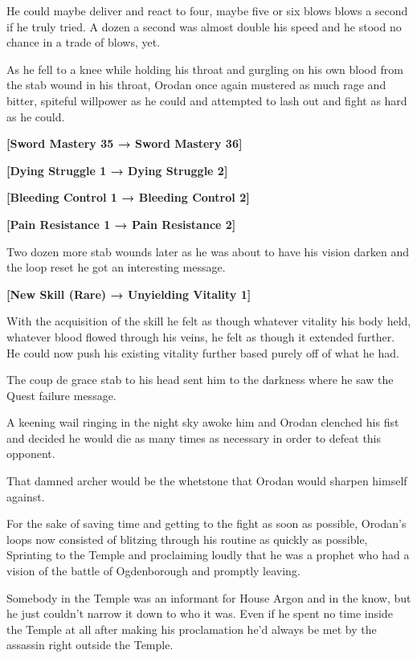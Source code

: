 \documentclass[a4paper,10pt]{book}
\begin{document}
He could maybe deliver and react to four, maybe five or six blows blows a second if he truly tried. A dozen a second was almost double his speed and he stood no chance in a trade of blows, yet.\par
As he fell to a knee while holding his throat and gurgling on his own blood from the stab wound in his throat, Orodan once again mustered as much rage and bitter, spiteful willpower as he could and attempted to lash out and fight as hard as he could.\par
\textbf{[Sword Mastery 35 → Sword Mastery 36]}\par
\textbf{[Dying Struggle 1 → Dying Struggle 2]}\par
\textbf{[Bleeding Control 1 → Bleeding Control 2]}\par
\textbf{[Pain Resistance 1 → Pain Resistance 2]}\par
Two dozen more stab wounds later as he was about to have his vision darken and the loop reset he got an interesting message.\par
\textbf{[New Skill (Rare) → Unyielding Vitality 1]}\par
With the acquisition of the skill he felt as though whatever vitality his body held, whatever blood flowed through his veins, he felt as though it extended further. He could now push his existing vitality further based purely off of what he had.\par
The coup de grace stab to his head sent him to the darkness where he saw the Quest failure message.\par
A keening wail ringing in the night sky awoke him and Orodan clenched his fist and decided he would die as many times as necessary in order to defeat this opponent.\par
That damned archer would be the whetstone that Orodan would sharpen himself against.\par
\par
For the sake of saving time and getting to the fight as soon as possible, Orodan’s loops now consisted of blitzing through his routine as quickly as possible, Sprinting to the Temple and proclaiming loudly that he was a prophet who had a vision of the battle of Ogdenborough and promptly leaving.\par
Somebody in the Temple was an informant for House Argon and in the know, but he just couldn’t narrow it down to who it was. Even if he spent no time inside the Temple at all after making his proclamation he’d always be met by the assassin right outside the Temple.\par
\end{document}

